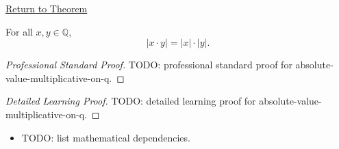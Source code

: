 \newpage
{}
\label{prf:absolute-value-multiplicative-on-q}

\begin{remark*}[Return]
\hyperref[thm:absolute-value-multiplicative-on-q]{Return to Theorem}
\end{remark*}

\begin{theorem*}
For all $x,y\in\mathbb{Q}$,
\[
|x\cdot y|=|x|\cdot |y|.
\]
\end{theorem*}

\begin{proof}[Professional Standard Proof]
\LRAProofBodyStart
TODO: professional standard proof for absolute-value-multiplicative-on-q.
\end{proof}

\begin{proof}[Detailed Learning Proof]
\LRAProofBodyStart
TODO: detailed learning proof for absolute-value-multiplicative-on-q.
\end{proof}

\begin{remark*}
\end{remark*}

\begin{dependencies}
\begin{itemize}
  \item TODO: list mathematical dependencies.
\end{itemize}
\end{dependencies}

\clearpage
